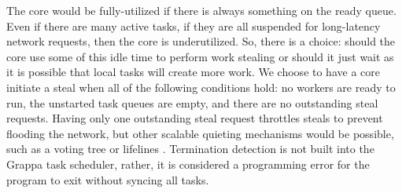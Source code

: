 The
core would be fully-utilized if there is always something on the ready
queue. Even if there are many active tasks, if they are all suspended
for long-latency network requests, then the core is underutilized. So,
there is a choice: should the core use some of this idle time to perform
work stealing or should it just wait as it is possible that local tasks
will create more work. We choose to have a core initiate a steal when
all of the following conditions hold: no workers are ready to run, the
unstarted task queues are empty, and there are no outstanding steal
requests. Having only one outstanding steal request throttles steals to
prevent flooding the network, but other scalable quieting mechanisms
would be possible, such as a voting
tree\cite{scalableWorkStealingOrCilk98} or lifelines \cite{lifelines}.
Termination detection is not built into the Grappa task scheduler,
rather, it is considered a programming error for the program to exit
without syncing all tasks.


